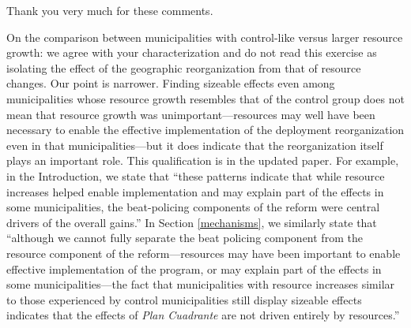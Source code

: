 %



Thank you very much for these comments.

On the comparison between municipalities with control-like versus larger resource growth: we agree with your characterization and do not read this exercise as isolating the effect of the geographic reorganization from that of resource changes. Our point is narrower. Finding sizeable effects even among municipalities whose resource growth resembles that of the control group does not mean that resource growth was unimportant---resources may well have been necessary to enable the effective implementation of the deployment reorganization even in that municipalities---but it does indicate that the reorganization itself plays an important role. This qualification is in the updated paper. For example, in the Introduction, we state that ``these patterns indicate that while resource increases helped enable implementation and may explain part of the effects in some municipalities, the beat-policing components of the reform were central drivers of the overall gains.'' In Section \ref{mechanisms}, we similarly state that ``although we cannot fully separate the beat policing component from the resource component of the reform---resources may have been important to enable effective implementation of the program, or may explain part of the effects in some municipalities---the fact that municipalities with resource increases similar to those experienced by control municipalities still display sizeable effects indicates that the effects of \emph{Plan Cuadrante} are not driven entirely by resources.''

